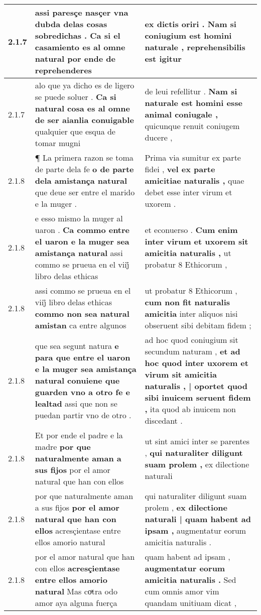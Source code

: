 \begin{tabular}{|p{1cm}|p{6.5cm}|p{6.5cm}|}
2.1.7 & assi paresçe nasçer vna dubda delas cosas sobredichas . \textbf{ Ca si el casamiento es al omne natural } por ende de reprehenderes & ex dictis oriri . \textbf{ Nam si coniugium est homini naturale , } reprehensibilis est igitur \\\hline
2.1.7 & alo que ya dicho es de ligero se puede soluer . \textbf{ Ca si natural cosa es al omne de ser aianlia conuigable } qualquier que esqua de tomar mugni & de leui refellitur . \textbf{ Nam si naturale est homini esse animal coniugale , } quicunque renuit coniugem ducere , \\\hline
2.1.8 & ¶ La primera razon se toma de parte dela fe \textbf{ o de parte dela amistança natural } que deue ser entre el marido e la muger . & Prima via sumitur ex parte fidei , \textbf{ vel ex parte amicitiae naturalis , } quae debet esse inter virum et uxorem . \\\hline
2.1.8 & e esso mismo la muger al uaron . \textbf{ Ca commo entre el uaron e la muger sea amistança natural } assi commo se prueua en el viij̊ libro delas ethicas & et econuerso . \textbf{ Cum enim inter virum et uxorem sit amicitia naturalis , } ut probatur 8 Ethicorum , \\\hline
2.1.8 & assi commo se prueua en el viij̊ libro delas ethicas \textbf{ commo non sea natural amistan } ca entre algunos & ut probatur 8 Ethicorum , \textbf{ cum non fit naturalis amicitia } inter aliquos nisi obseruent sibi debitam fidem ; \\\hline
2.1.8 & que sea segunt natura \textbf{ e para que entre el uaron e la muger sea amistança natural conuiene que guarden vno a otro fe e lealtad } assi que non se puedan partir vno de otro . & ad hoc quod coniugium sit secundum naturam , \textbf{ et ad hoc quod inter uxorem et virum sit amicitia naturalis , | oportet quod sibi inuicem seruent fidem , } ita quod ab inuicem non discedant . \\\hline
2.1.8 & Et por ende el padre e la madre \textbf{ por que naturalmente aman a sus fijos } por el amor natural que han con ellos & ut sint amici inter se parentes , \textbf{ qui naturaliter diligunt suam prolem , } ex dilectione naturali \\\hline
2.1.8 & por que naturalmente aman a sus fijos \textbf{ por el amor natural que han con ellos } acresçientase entre ellos amorio natural & qui naturaliter diligunt suam prolem , \textbf{ ex dilectione naturali | quam habent ad ipsam , } augmentatur eorum amicitia naturalis . \\\hline
2.1.8 & por el amor natural que han con ellos \textbf{ acresçientase entre ellos amorio natural } Mas coͣtra odo amor aya alguna fuerça & quam habent ad ipsam , \textbf{ augmentatur eorum amicitia naturalis . } Sed cum omnis amor vim quandam unitiuam dicat , \\\hline

\end{tabular}
